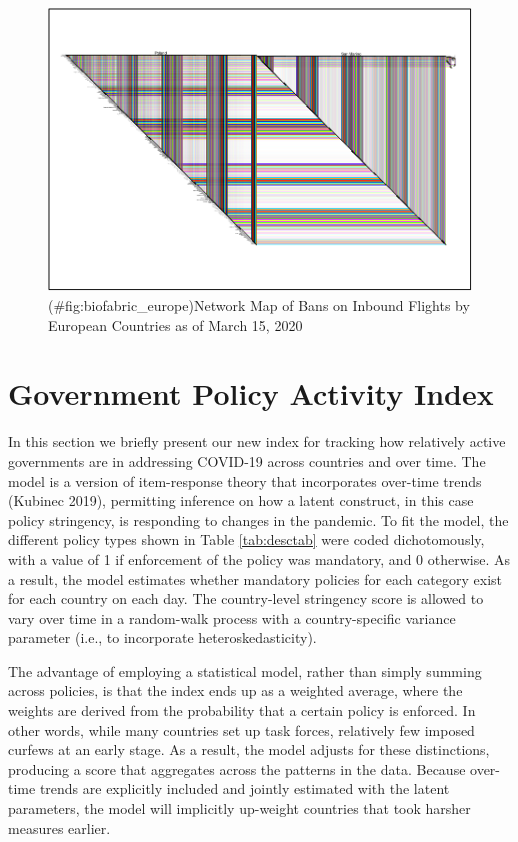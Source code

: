 \documentclass[]{article}
\begin{document}
\begin{figure}
\centering
\includegraphics{corona_wp_files/figure-latex/biofabric_europe-1.pdf}
\caption{(\#fig:biofabric\_europe)Network Map of Bans on Inbound Flights by European Countries as of March 15, 2020}
\end{figure}

\hypertarget{government-policy-activity-index}{%
\section{Government Policy Activity Index}\label{government-policy-activity-index}}

In this section we briefly present our new index for tracking how relatively active governments are in addressing COVID-19 across countries and over time. The model is a version of item-response theory that incorporates over-time trends (Kubinec 2019), permitting inference on how a latent construct, in this case policy stringency, is responding to changes in the pandemic. To fit the model, the different policy types shown in Table \ref{tab:desctab} were coded dichotomously, with a value of 1 if enforcement of the policy was mandatory, and 0 otherwise. As a result, the model estimates whether mandatory policies for each category exist for each country on each day. The country-level stringency score is allowed to vary over time in a random-walk process with a country-specific variance parameter (i.e., to incorporate heteroskedasticity).

The advantage of employing a statistical model, rather than simply summing across policies, is that the index ends up as a weighted average, where the weights are derived from the probability that a certain policy is enforced. In other words, while many countries set up task forces, relatively few imposed curfews at an early stage. As a result, the model adjusts for these distinctions, producing a score that aggregates across the patterns in the data. Because over-time trends are explicitly included and jointly estimated with the latent parameters, the model will implicitly up-weight countries that took harsher measures earlier.
\end{document}
